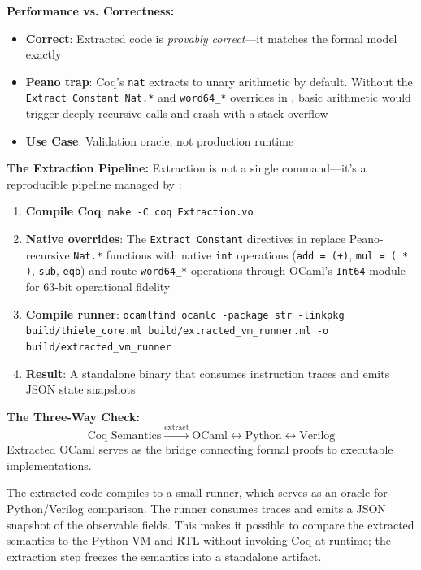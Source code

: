 \textbf{Performance vs. Correctness:}
\begin{itemize}
    \item \textbf{Correct}: Extracted code is \emph{provably correct}---it matches the formal model exactly
    \item \textbf{Peano trap}: Coq's \texttt{nat} extracts to unary arithmetic by default. Without the \texttt{Extract Constant Nat.*} and \texttt{word64\_*} overrides in , basic arithmetic would trigger deeply recursive calls and crash with a stack overflow
    \item \textbf{Use Case}: Validation oracle, not production runtime
\end{itemize}

\textbf{The Extraction Pipeline:}
Extraction is not a single command---it's a reproducible pipeline managed by :
\begin{enumerate}
    \item \textbf{Compile Coq}: \texttt{make -C coq Extraction.vo}
    \item \textbf{Native overrides}: The \texttt{Extract Constant} directives in  replace Peano-recursive \texttt{Nat.*} functions with native \texttt{int} operations (\texttt{add = (+)}, \texttt{mul = ( * )}, \texttt{sub}, \texttt{eqb}) and route \texttt{word64\_*} operations through OCaml's \texttt{Int64} module for 63-bit operational fidelity
    \item \textbf{Compile runner}: \texttt{ocamlfind ocamlc -package str -linkpkg build/thiele\_core.ml build/extracted\_vm\_runner.ml -o build/extracted\_vm\_runner}
    \item \textbf{Result}: A standalone binary that consumes instruction traces and emits JSON state snapshots
\end{enumerate}

\textbf{The Three-Way Check:}
\[
\text{Coq Semantics} \xrightarrow{\text{extract}} \text{OCaml} \longleftrightarrow \text{Python} \longleftrightarrow \text{Verilog}
\]
Extracted OCaml serves as the bridge connecting formal proofs to executable implementations.

The extracted code compiles to a small runner, which serves as an oracle for Python/Verilog comparison.
The runner consumes traces and emits a JSON snapshot of the observable fields. This makes it possible to compare the extracted semantics to the Python VM and RTL without invoking Coq at runtime; the extraction step freezes the semantics into a standalone artifact.

